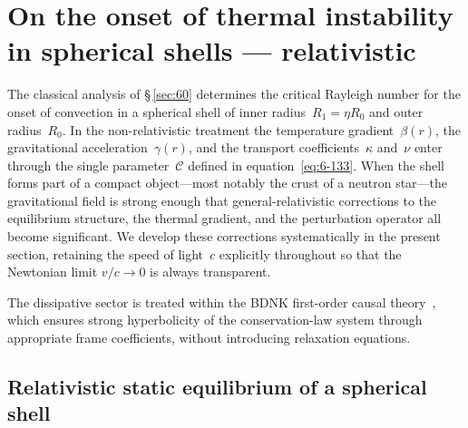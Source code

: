 %

\section{On the onset of thermal instability in spherical shells ---
  relativistic}\label{sec:rel-60}

The classical analysis of \S\,\ref{sec:60} determines the critical
Rayleigh number for the onset of convection in a spherical shell of
inner radius~$R_1=\eta R_0$ and outer radius~$R_0$.  In the
non-relativistic treatment the temperature gradient~$\beta(r)$, the
gravitational acceleration~$\gamma(r)$, and the transport
coefficients~$\kappa$ and~$\nu$ enter through the single
parameter~$\mathcal{C}$ defined in equation~\eqref{eq:6-133}.  When
the shell forms part of a compact object---most notably the crust of a
neutron star---the gravitational field is strong enough that
general-relativistic corrections to the equilibrium structure, the
thermal gradient, and the perturbation operator all become significant.
We develop these corrections systematically in the present section,
retaining the speed of light~$c$ explicitly throughout so that the
Newtonian limit $v/c\to 0$ is always transparent.

The dissipative sector is treated within the BDNK first-order causal
theory~\cite{BemficaDN2018,Kovtun2019,BemficaDN2019}, which ensures
strong hyperbolicity of the conservation-law system through appropriate
frame coefficients, without introducing relaxation equations.

\subsection{Relativistic static equilibrium of a spherical shell}
\label{sec:rel-60-equil}

